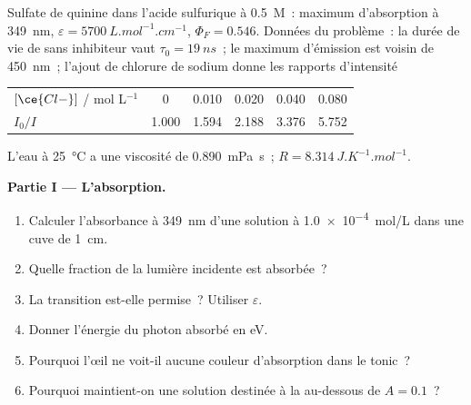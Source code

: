 \begin{problem}
\label{pb:b3:electronic-spectroscopy:1}
Sulfate de quinine dans l'acide sulfurique à \qty{0.5}{M}~: maximum
d'absorption à \qty{349}{nm},
$\varepsilon = \qty{5700}{L.mol^{-1}.cm^{-1}}$, $\Phi_F = 0.546$. Données
du problème~: la durée de vie de  sans inhibiteur vaut
$\tau_0 = \qty{19}{ns}$~; le maximum d'émission est voisin de
\qty{450}{nm}~; l'ajout de chlorure de sodium donne les rapports
d'intensité
\begin{center}\small
\begin{tabular}{lccccc}
\hline
$[\ce{Cl-}]$ / mol L$^{-1}$ & 0 & 0.010 & 0.020 & 0.040 & 0.080 \\
$I_0/I$ & 1.000 & 1.594 & 2.188 & 3.376 & 5.752 \\ \hline
\end{tabular}
\end{center}
L'eau à \qty{25}{\celsius} a une viscosité de \qty{0.890}{mPa.s}~; $R =
\qty{8.314}{J.K^{-1}.mol^{-1}}$.

\medskip\noindent\textbf{Partie I --- L'absorption.}
\begin{enumerate}
  \item Calculer l'absorbance à \qty{349}{nm} d'une solution à
        \qty{1.0e-4}{mol/L} dans une cuve de
        \qty{1}{cm}.
  \item Quelle fraction de la lumière incidente est absorbée~?
  \item La transition est-elle permise~? Utiliser $\varepsilon$.
  \item Donner l'énergie du photon absorbé en eV.
  \item Pourquoi l'œil ne voit-il aucune couleur d'absorption dans le
        tonic~?
  \item Pourquoi maintient-on une solution destinée à la 
        au-dessous de $A = 0.1$~?
\end{enumerate}


\end{problem}
